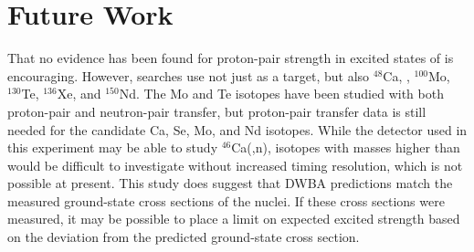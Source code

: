 \section{Future Work}
\begin{comment}
Weaknesses of this work are: 
1. STATISTICS LIMITED AARGH!!!  liquid scintillator would be helpful in reclaiming low-energy transfer neutron hits which could improve statistics by ~30\% (<- this is NOT currently precise!)
2. momentum mismatching between the pair transfer we're looking at and pair correlations most relevant to \zvbb?  
3. ?? come on there must be other issues

Future work that would be helpful would be
1. looking at this pair transfer on other targets
2. leptonic probes that could excite pair correlations at higher momenta? \cite{LeptonPP}
\end{comment}
That no evidence has been found for proton-pair strength in excited \zp states of \GeTargets is encouraging.  However, \zvbb searches use not just  as a target, but also $^{48}$Ca, , $^{100}$Mo, $^{130}$Te, $^{136}$Xe, and $^{150}$Nd.  The Mo and Te isotopes have been studied with both proton-pair and neutron-pair transfer, but proton-pair transfer data is still needed for the candidate Ca, Se, Mo, and Nd isotopes.  While the detector used in this experiment may be able to study $^{46}$Ca(,n), isotopes with masses higher than \GeTargets would be difficult to investigate without increased timing resolution, which is not possible at present.  This study does suggest that DWBA predictions match the measured ground-state cross sections of the \fpg nuclei.  If these cross sections were measured, it may be possible to place a limit on expected excited \zp strength based on the deviation from the predicted ground-state cross section.

%
% 
% 
